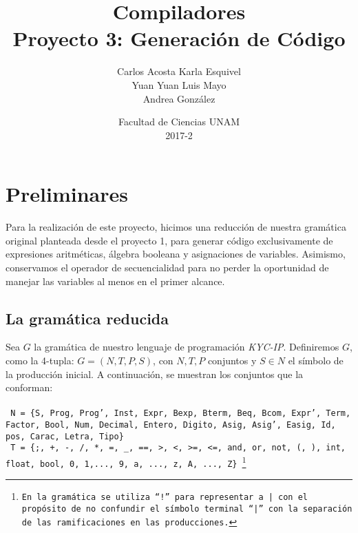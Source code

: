 \documentclass[12pt]{article}
\title{Compiladores\\ Proyecto 3: Generación de Código}
\author{Carlos Acosta \qquad Karla Esquivel \\ Yuan Yuan \qquad Luis Mayo \\ Andrea González}
\date{Facultad de Ciencias UNAM \\ 2017-2}
\begin{document}
\maketitle
\section{Preliminares}
Para la realización de este proyecto, hicimos una reducción de nuestra gramática original planteada
desde el proyecto 1, para generar código exclusivamente de expresiones aritméticas, álgebra booleana y asignaciones de variables. Asimismo, conservamos el operador de secuencialidad para no perder la oportunidad de manejar las variables al menos en el primer alcance.
\subsection{La gramática reducida}
Sea $G$ la gramática de nuestro lenguaje de programación \textit{KYC-IP}. Definiremos $G$, como la 4-tupla: $G = (N,T,P,S)$, con $N,T,P$ conjuntos y $S \in N$ el símbolo de la producción inicial.
A continuación, se muestran los conjuntos que la conforman:\\ \\
\texttt{ 
N = \{S, Prog, Prog', Inst, Expr, Bexp, Bterm, Beq, Bcom, Expr', Term, Factor, Bool, Num, Decimal, Entero, Digito, Asig, Asig', Easig, Id, pos, Carac, Letra, Tipo\}
}\\

\texttt{
T = \{;, +, -, /, *, =, \_, ==, >, <, >=, <=, and, or, not, (, ), int, float, bool, 0, 1,..., 9, a, ..., z, A, ..., Z\}  \footnote{En la gramática se utiliza ``!'' para representar a | con el propósito de no confundir el símbolo terminal ``|'' con la separación de las ramificaciones en las producciones.}
}\\
\end{document}
